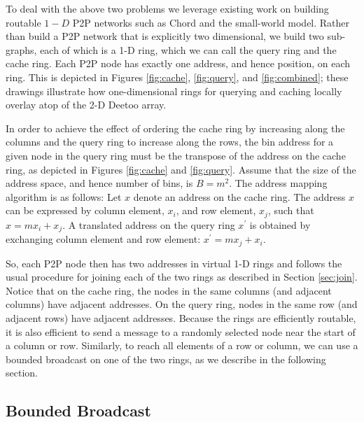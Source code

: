\documentclass[9.5pt,journal,final,finalsubmission,twocolumn]{IEEEtran}
\begin{document}
To deal with the above two problems we leverage existing work on building
routable $1-D$ P2P networks such as Chord\cite{is:Chord} and the small-world
model\cite{jk:Algorithmic}.  Rather than build a P2P network that is
explicitly two dimensional, we build two sub-graphs, each of which is a 1-D 
ring, which we can call the query ring and the cache ring.  Each P2P 
node has exactly one address, and hence position, on each ring.  This is
depicted in Figures \ref{fig:cache}, \ref{fig:query}, and \ref{fig:combined}; 
these drawings illustrate how one-dimensional rings for querying and caching 
locally overlay atop of the 2-D Deetoo array.

In order to achieve the effect of ordering the cache ring by increasing
along the columns and the query ring to increase along the rows, the bin
address for a given node in the query ring must be the transpose of the
address on the cache ring, as depicted in Figures \ref{fig:cache} and \ref{fig:query}.  
Assume that the size of the address space,
and hence number of bins, is $B=m^2$.
The address mapping algorithm is as
follows: Let $x$ denote an address on the cache ring. The address
$x$ can be expressed by
column element, $x_{i}$, and row element, $x_{j}$, such
that $x = m x_i + x_j$.
A translated address on the query ring $x^\prime$ is obtained by exchanging
column element and row element:
$x^\prime = m x_{j} +x_{i}$.

So, each P2P node then has two addresses in virtual 1-D rings and follows the usual
procedure for joining each of the two rings as described in Section \ref{sec:join}.
Notice that on the cache ring, the nodes in the same columns (and adjacent
columns) have adjacent addresses.  On the query ring, nodes in the same row
(and adjacent rows) have adjacent addresses.  Because the rings are efficiently
routable, it is also efficient to send a message to a randomly selected node near
the start of a column or row.  Similarly, to reach all elements of a row or
column, we can use a bounded broadcast on one of the two rings, as we describe
in the following section. 

\subsection{Bounded Broadcast}
\label{sec:broadcast}
\end{document}
